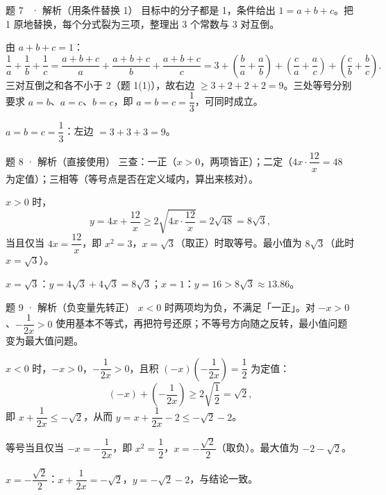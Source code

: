 \begin{solution}{题 7 \starred\ · 解析（用条件替换 1）}
\think 目标中的分子都是 1，条件给出 $1=a+b+c$。把 1 原地替换，每个分式裂为三项，整理出 3 个常数与 3 对互倒。

\solve 由 $a+b+c=1$：
\[
\frac1a+\frac1b+\frac1c=\frac{a+b+c}{a}+\frac{a+b+c}{b}+\frac{a+b+c}{c}
=3+\left(\frac ba+\frac ab\right)+\left(\frac ca+\frac ac\right)+\left(\frac cb+\frac bc\right).
\]
三对互倒之和各不小于 2（题 1(1)），故右边 $\ge 3+2+2+2=9$。三处等号分别要求 $a=b$、$a=c$、$b=c$，即 $a=b=c=\dfrac13$，可同时成立。

\checkup $a=b=c=\dfrac13$：左边 $=3+3+3=9$。

\end{solution}

\begin{solution}{题 8 · 解析（直接使用）}
\think 三查：一正（$x>0$，两项皆正）；二定（$4x\cdot\dfrac{12}x=48$ 为定值）；三相等（等号点是否在定义域内，算出来核对）。

\solve $x>0$ 时，
\[
y=4x+\frac{12}{x}\ge 2\sqrt{4x\cdot\frac{12}{x}}=2\sqrt{48}=8\sqrt3,
\]
当且仅当 $4x=\dfrac{12}{x}$，即 $x^2=3$，$x=\sqrt3$（取正）时取等号。最小值为 $8\sqrt3$（此时 $x=\sqrt3$）。

\checkup $x=\sqrt3$：$y=4\sqrt3+4\sqrt3=8\sqrt3$；$x=1$：$y=16>8\sqrt3\approx 13.86$。

\end{solution}

\begin{solution}{题 9 · 解析（负变量先转正）}
\think $x<0$ 时两项均为负，不满足「一正」。对 $-x>0$、$-\dfrac{1}{2x}>0$ 使用基本不等式，再把符号还原；不等号方向随之反转，最小值问题变为最大值问题。

\solve $x<0$ 时，$-x>0$，$-\dfrac{1}{2x}>0$，且积 $(-x)\left(-\dfrac{1}{2x}\right)=\dfrac12$ 为定值：
\[
(-x)+\left(-\frac{1}{2x}\right)\ge 2\sqrt{\frac12}=\sqrt2,
\]
即 $x+\dfrac{1}{2x}\le-\sqrt2$，从而 $y=x+\dfrac{1}{2x}-2\le-\sqrt2-2$。

等号当且仅当 $-x=-\dfrac{1}{2x}$，即 $x^2=\dfrac12$，$x=-\dfrac{\sqrt2}{2}$（取负）。最大值为 $-2-\sqrt2$。

\checkup $x=-\dfrac{\sqrt2}2$：$x+\dfrac1{2x}=-\sqrt2$，$y=-\sqrt2-2$，与结论一致。

\end{solution}

